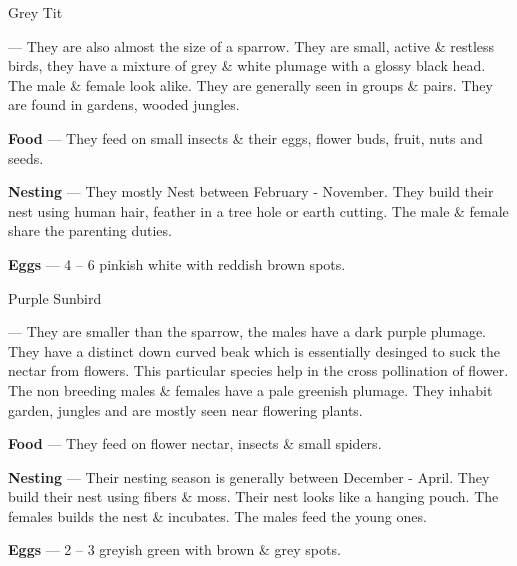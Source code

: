 \begin{bird}{Grey Tit}

 --- They are also almost the size of a sparrow. They are small, active \& restless birds, they have a mixture of grey \& white plumage with a glossy black head. The male \& female look alike. They are generally seen in groups \& pairs. They are found in gardens, wooded jungles. 

{\large\bf Food} --- They feed on small insects \& their eggs, flower buds, fruit, nuts and seeds.

{\large\bf Nesting} --- They mostly Nest between February - November. They build their nest using human hair, feather in a tree hole or earth cutting. The male \& female share the parenting duties.

{\large\bf Eggs} --- 4 -- 6 pinkish white with reddish brown spots.
\end{bird}

\begin{bird}{Purple Sunbird}

 --- They are smaller than the sparrow, the males have a dark purple plumage. They have a distinct down curved beak which is essentially desinged to suck the nectar from flowers. This particular species help in the cross pollination of flower. The non breeding males \& females have a pale greenish plumage. They inhabit garden, jungles and are mostly seen near flowering plants.

{\large\bf Food} --- They feed on flower nectar, insects \& small spiders.

{\large\bf Nesting} --- Their nesting season is generally between December - April. They build their nest using fibers \& moss. Their nest looks like a hanging pouch. The females builds the nest \& incubates. The males feed the young ones.

{\large\bf Eggs} --- 2 -- 3 greyish green with brown \& grey spots.
\end{bird}

